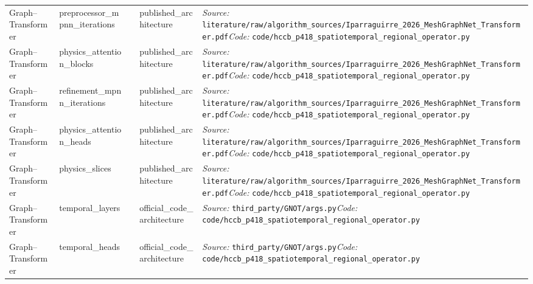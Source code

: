 \begin{longtable}{>{\raggedright\arraybackslash}p{2.7cm}>{\raggedright\arraybackslash}p{3.2cm}>{\raggedright\arraybackslash}p{1.5cm}>{\raggedright\arraybackslash}p{2.6cm}>{\raggedright\arraybackslash}p{8.0cm}}
Graph--Transformer & preprocessor\_\allowbreak{}mpnn\_\allowbreak{}iterations & 2 & published\_\allowbreak{}architecture & \textit{Source:} \nolinkurl{literature/raw/algorithm_sources/Iparraguirre_2026_MeshGraphNet_Transformer.pdf}\newline \textit{Code:} \nolinkurl{code/hccb_p418_spatiotemporal_regional_operator.py} \\
Graph--Transformer & physics\_\allowbreak{}attention\_\allowbreak{}blocks & 2 & published\_\allowbreak{}architecture & \textit{Source:} \nolinkurl{literature/raw/algorithm_sources/Iparraguirre_2026_MeshGraphNet_Transformer.pdf}\newline \textit{Code:} \nolinkurl{code/hccb_p418_spatiotemporal_regional_operator.py} \\
Graph--Transformer & refinement\_\allowbreak{}mpnn\_\allowbreak{}iterations & 2 & published\_\allowbreak{}architecture & \textit{Source:} \nolinkurl{literature/raw/algorithm_sources/Iparraguirre_2026_MeshGraphNet_Transformer.pdf}\newline \textit{Code:} \nolinkurl{code/hccb_p418_spatiotemporal_regional_operator.py} \\
Graph--Transformer & physics\_\allowbreak{}attention\_\allowbreak{}heads & 4 & published\_\allowbreak{}architecture & \textit{Source:} \nolinkurl{literature/raw/algorithm_sources/Iparraguirre_2026_MeshGraphNet_Transformer.pdf}\newline \textit{Code:} \nolinkurl{code/hccb_p418_spatiotemporal_regional_operator.py} \\
Graph--Transformer & physics\_\allowbreak{}slices & 128 & published\_\allowbreak{}architecture & \textit{Source:} \nolinkurl{literature/raw/algorithm_sources/Iparraguirre_2026_MeshGraphNet_Transformer.pdf}\newline \textit{Code:} \nolinkurl{code/hccb_p418_spatiotemporal_regional_operator.py} \\
Graph--Transformer & temporal\_\allowbreak{}layers & 3 & official\_\allowbreak{}code\_\allowbreak{}architecture & \textit{Source:} \nolinkurl{third_party/GNOT/args.py}\newline \textit{Code:} \nolinkurl{code/hccb_p418_spatiotemporal_regional_operator.py} \\
Graph--Transformer & temporal\_\allowbreak{}heads & 1 & official\_\allowbreak{}code\_\allowbreak{}architecture & \textit{Source:} \nolinkurl{third_party/GNOT/args.py}\newline \textit{Code:} \nolinkurl{code/hccb_p418_spatiotemporal_regional_operator.py} \\

\end{longtable}
